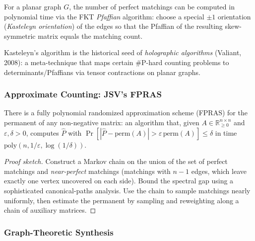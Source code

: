 \begin{theorem}[Kasteleyn, 1961--1967]\label{thm:kasteleyn}
For a planar graph $G$, the number of perfect matchings can be
computed in polynomial time via the FKT \emph{Pfaffian} algorithm:
choose a special $\pm 1$ orientation (\emph{Kasteleyn orientation})
of the edges so that the Pfaffian of the resulting skew-symmetric
matrix equals the matching count.
\end{theorem}

\begin{remark}
Kasteleyn's algorithm is the historical seed of \emph{holographic
algorithms} (Valiant, 2008): a meta-technique that maps certain
\#P-hard counting problems to determinants/Pfaffians via tensor
contractions on planar graphs.
\end{remark}

\subsubsection{Approximate Counting: JSV's FPRAS}

\begin{theorem}\label{thm:jsv}
There is a fully polynomial randomized approximation scheme (FPRAS)
for the permanent of any non-negative matrix: an algorithm that, given
$A \in \mathbb R_{\ge 0}^{n \times n}$ and $\varepsilon, \delta > 0$,
computes $\widehat P$ with
$\Pr[|\widehat P - \mathrm{perm}(A)| > \varepsilon \, \mathrm{perm}(A)] \le \delta$
in time $\mathrm{poly}(n, 1/\varepsilon, \log(1/\delta))$.
\end{theorem}

\begin{proof}[Proof sketch]
Construct a Markov chain on the union of the set of perfect matchings
and \emph{near-perfect} matchings (matchings with $n - 1$ edges, which
leave exactly one vertex uncovered on each side). Bound the spectral
gap using a sophisticated canonical-paths
analysis. Use the chain to sample matchings nearly uniformly, then
estimate the permanent by sampling and reweighting along a chain of
auxiliary matrices.
\end{proof}

\subsubsection{Graph-Theoretic Synthesis}

